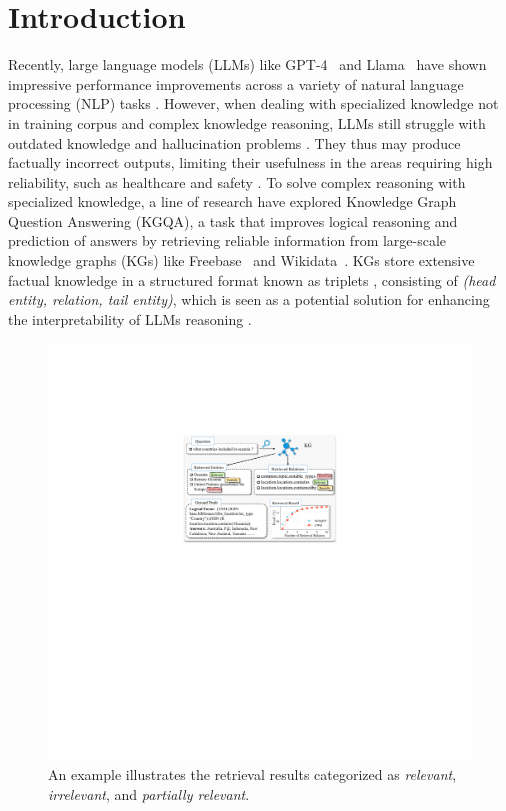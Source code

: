 \section{Introduction} \label{sec:intro}


Recently, large language models (LLMs) like GPT-4~\cite{openai2024gpt4} and Llama~\cite{touvron2023llama} have shown impressive performance improvements across a variety of natural language processing (NLP) tasks \cite{LeiWANG186345,MuningWEN176349,DerongXU186357,YufeiZENG176340,wu2024survey,liu2024unimel}. However, when dealing with specialized knowledge not in training corpus and complex knowledge reasoning, LLMs still struggle with outdated knowledge and hallucination problems \cite{ji2023survey}. They thus may produce factually incorrect outputs, limiting their usefulness in the areas requiring high reliability, such as healthcare \cite{he2023survey,liu2024moe} and safety \cite{dong2024attacks}. 
To solve complex reasoning with specialized knowledge, a line of research \cite{chatkbqa,TOG} have explored Knowledge Graph Question Answering (KGQA), a task that improves logical reasoning and prediction of answers by retrieving reliable information from large-scale knowledge graphs (KGs) like Freebase~\cite{bollacker2008freebase} and Wikidata~\cite{wikidata}. KGs store extensive factual knowledge in a structured format known as triplets \cite{xu2024multi,xu2022relation,wang2023federated}, consisting of \textit{(head entity, relation, tail entity)}, which is seen as a potential solution for enhancing the interpretability of LLMs reasoning \cite{TOG}.
\begin{figure}[t]
\centering
\includegraphics[width=0.9\linewidth]{img/intro.pdf}
\caption{ An example illustrates the retrieval results categorized as \textit{relevant}, \textit{irrelevant}, and \textit{partially relevant}.
}
\label{fig:intro}
\end{figure}

